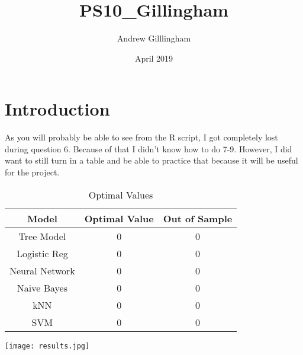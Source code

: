\documentclass{article}
\title{PS10_Gillingham}
\author{Andrew Gilllingham }
\date{April 2019}
\begin{document}
\maketitle

\section{Introduction}
As you will probably be able to see from the R script, I got completely lost during question 6. Because of that I didn't know how to do 7-9. However, I did want to still turn in a table and be able to practice that because it will be useful for the project. 

\begin{table}[ht]
\caption{Optimal Values}
\centering
\begin{tabular}{c c c}
\hline\hline
Model & Optimal Value & Out of Sample \\ [0.5ex]
\hline
Tree Model & 0 & 0  \\
Logistic Reg & 0 & 0    \\
Neural Network & 0 & 0  \\
Naive Bayes & 0 & 0 \\
kNN & 0 & 0 \\
SVM & 0 & 0 \\ 
\hline
\end{tabular}
\label{table:Optimal}
\end{table}

\texttt{[image: results.jpg]}
\end{document}
